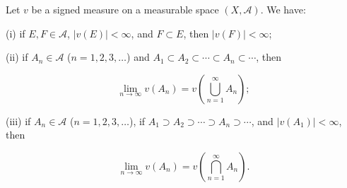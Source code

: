 Let $v$ be a signed measure on a measurable space $(X, \mathcal{A})$. We have:

(i) if $E, F \in \mathcal{A}$, $|v(E)| < \infty$, and $F \subset E$, then $|v(F)| < \infty$;

(ii) if $A_n \in \mathcal{A}$ ($n = 1, 2, 3, \ldots$) and $A_1 \subset A_2 \subset \cdots \subset A_n \subset \cdots$, then

$$\lim_{n \to \infty} v(A_n) = v\left(\bigcup_{n=1}^{\infty} A_n\right);$$

(iii) if $A_n \in \mathcal{A}$ ($n = 1, 2, 3, \ldots$), if $A_1 \supset A_2 \supset \cdots \supset A_n \supset \cdots$, and $|v(A_1)| < \infty$, then

$$\lim_{n \to \infty} v(A_n) = v\left(\bigcap_{n=1}^{\infty} A_n\right).$$